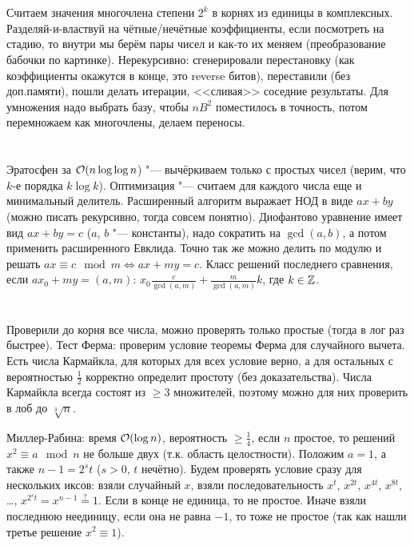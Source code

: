 \section{} %
Считаем значения многочлена степени $2^k$ в корнях из единицы в комплексных.
Разделяй-и-властвуй на чётные/нечётные коэффициенты, если посмотреть на стадию, то внутри мы берём пары чисел и как-то их меняем (преобразование бабочки по картинке).
Нерекурсивно: сгенерировали перестановку (как коэффициенты окажутся в конце, это reverse битов), переставили (без доп.памяти), пошли делать итерации, <<сливая>> соседние результаты.
Для умножения надо выбрать базу, чтобы $nB^2$ поместилось в точность, потом перемножаем как многочлены, делаем переносы.

\section{} %
\TODO

\section{} %
Эратосфен за $\mathcal{O}(n \log \log n$) "--- вычёркиваем только с простых чисел (верим, что $k$-е порядка $k \log k$).
Оптимизация "--- считаем для каждого числа еще и минимальный делитель.
Расширенный алгоритм выражает НОД в виде $ax+by$ (можно писать рекурсивно, тогда совсем понятно).
Диофантово уравнение имеет вид $ax+by=c$ ($a$, $b$ "--- константы), надо сократить на $\gcd(a, b)$, а потом применить расширенного Евклида.
Точно так же можно делить по модулю и решать $ax\equiv c \mod m \iff ax+my = c$.
Класс решений последнего сравнения, если $ax_0 + my = (a, m)$: $x_0 \frac{c}{\gcd(a, m)} + \frac{m}{\gcd(a, m)}k$, где $k \in \mathbb{Z}$.

\section{} %
Проверили до корня все числа, можно проверять только простые (тогда в лог раз быстрее).
Тест Ферма: проверим условие теоремы Ферма для случайного вычета.
Есть числа Кармайкла, для которых для всех условие верно, а для остальных с вероятностью $\frac 12$ корректно определит простоту (без доказательства).
Числа Кармайкла всегда состоят из $\ge 3$ множителей, поэтому можно для них проверить в лоб до $\sqrt[3]n$.

Миллер-Рабина: время $\mathcal{O}(\log n)$, вероятность $\ge \frac 14$, если $n$ простое, то решений $x^2 \equiv a \mod n$ не больше двух (т.к. область целостности).
Положим $a=1$, а также $n-1 = 2^st$ ($s>0$, $t$ нечётно).
Будем проверять условие сразу для нескольких иксов: взяли случайный $x$, взяли последовательность $x^t$, $x^{2t}$, $x^{4t}$, $x^{8t}$, \dots, $x^{2^st}=x^{n-1}\stackrel{?}{=}1$.
Если в конце не единица, то не простое.
Иначе взяли последнюю неединицу, если она не равна $-1$, то тоже не простое (так как нашли третье решение $x^2\equiv 1$).

